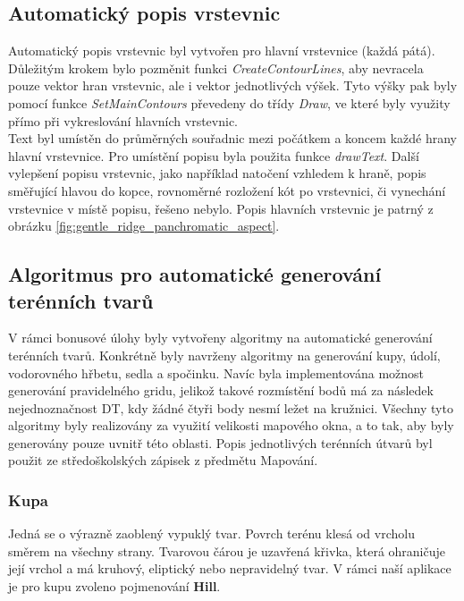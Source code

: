 \documentclass[a4paper,11pt,twoside]{article}
\begin{document}
\subsection{Automatický popis vrstevnic}
Automatický popis vrstevnic byl vytvořen pro hlavní vrstevnice (každá pátá). Důležitým krokem bylo pozměnit funkci \textit{CreateContourLines}, aby nevracela pouze vektor hran vrstevnic, ale i vektor jednotlivých výšek. Tyto výšky pak byly pomocí funkce \textit{SetMainContours} převedeny do třídy \textit{Draw}, ve které byly využity přímo při vykreslování hlavních vrstevnic.\\ \indent Text byl umístěn do průměrných souřadnic mezi počátkem a koncem každé hrany hlavní vrstevnice. Pro umístění popisu byla použita funkce \textit{drawText}. Další vylepšení popisu vrstevnic, jako například natočení vzhledem k hraně, popis směřující hlavou do kopce, rovnoměrné rozložení kót po vrstevnici, či vynechání vrstevnice v místě popisu, řešeno nebylo. Popis hlavních vrstevnic je patrný z obrázku \ref{fig:gentle_ridge_panchromatic_aspect}.

\newpage
\vspace*{-1cm}
\subsection{Algoritmus pro automatické generování terénních tvarů}
V rámci bonusové úlohy byly vytvořeny algoritmy na automatické generování terénních tvarů. Konkrétně byly navrženy algoritmy na generování kupy, údolí, vodorovného hřbetu, sedla a spočinku. Navíc byla implementována možnost generování pravidelného gridu, jelikož takové rozmístění bodů má za následek nejednoznačnost DT, kdy žádné čtyři body nesmí ležet na kružnici. Všechny tyto algoritmy byly realizovány za využití velikosti mapového okna, a to tak, aby byly generovány pouze uvnitř této oblasti. Popis jednotlivých terénních útvarů byl použit ze středoškolských zápisek z předmětu Mapování.

\subsubsection{Kupa}
Jedná se o výrazně zaoblený vypuklý tvar. Povrch terénu klesá od vrcholu směrem na všechny strany. Tvarovou čárou je uzavřená křivka, která ohraničuje její vrchol a má kruhový, eliptický nebo nepravidelný tvar. V rámci naší aplikace je pro kupu zvoleno pojmenování \textbf{Hill}.
\end{document}
